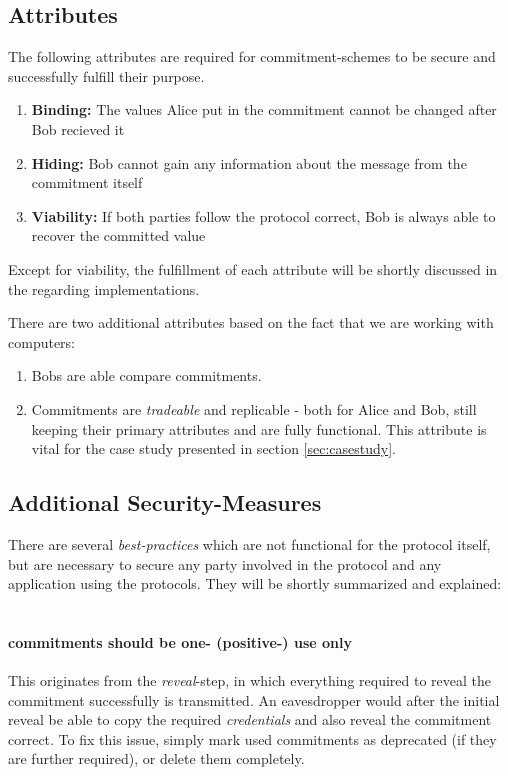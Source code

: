 \documentclass[conference]{IEEEtran}
\begin{document}
\subsection{Attributes}
The following attributes are required for commitment-schemes to be secure and successfully fulfill their purpose.

\begin{enumerate}
	\item \textbf{Binding:} The values Alice put in the commitment cannot be changed after Bob recieved it 
	\item \textbf{Hiding:} Bob cannot gain any information about the message from the commitment itself
	\item \textbf{Viability:} If both parties follow the protocol correct, Bob is always able to recover the committed value
\end{enumerate}
Except for viability, the fulfillment of each attribute will be shortly discussed in the regarding implementations. 

There are two additional attributes based on the fact that we are working with computers:
\begin{enumerate}
	\item Bobs are able compare commitments.
	\item Commitments are \textit{tradeable} and replicable - both for Alice and Bob, still keeping their primary attributes and are fully functional. This attribute is vital for the case study presented in section \ref{sec:casestudy}.
\end{enumerate}


\subsection{Additional Security-Measures}
There are several \textit{best-practices} which are not functional for the protocol itself, but are necessary to secure any party involved in the protocol and any application using the protocols. They will be shortly summarized and explained: ~\newline

	\paragraph{commitments should be one- (positive-) use only} This originates from the \textit{reveal}-step, in which everything required to reveal the commitment successfully is transmitted. An eavesdropper would after the initial reveal be able to copy the required \textit{credentials} and also reveal the commitment correct.  To fix this issue, simply mark used commitments as deprecated (if they are further required), or delete them completely. 
\end{document}
